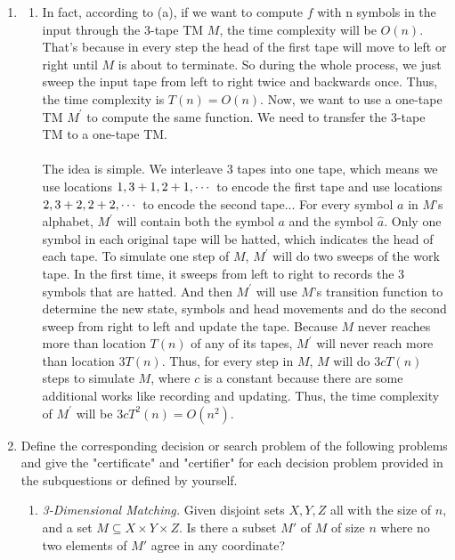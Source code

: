 \documentclass[12pt,a4paper]{article}
\makeatletter
\newtheorem*{solution}{Solution}
\theoremstyle{definition}
\renewenvironment{solution}[1][Solution] {\par\pushQED{\qed}\normalfont\topsep6\p@\@plus6\p@\relax\trivlist\item[\hskip\labelsep\bfseries#1\@addpunct{.}]\ignorespaces}{\popQED\endtrivlist\@endpefalse} \makeatother
\makeatother
\begin{document}
\begin{enumerate}
\begin{solution}
\begin{enumerate}
	    \item
	    In fact, according to (a), if we want to compute $f$ with n symbols in the input through the 3-tape TM $M$, the time complexity will be $O(n)$. That's because in every step the head of the first tape will move to left or right until $M$ is about to terminate. So during the whole process, we just sweep the input tape from left to right twice and backwards once. Thus, the time complexity is $T(n)=O(n)$. Now, we want to use a one-tape TM $M^{'}$ to compute the same function. We need to transfer the 3-tape TM to a one-tape TM.\\
	    ~\\
	    The idea is simple. We interleave 3 tapes into one tape, which means we use locations $1,3+1,2\time 3+1,\cdots$ to encode the first tape and use locations $2,3+2,2\time 3+2,\cdots$ to encode the second tape... For every symbol $a$ in $M$'s alphabet, $M^{'}$ will contain both the symbol $a$ and the symbol $\hat{a}$. Only one symbol in each original tape will be hatted, which indicates the head of each tape. To simulate one step of $M$, $M^{'}$ will do two sweeps of the work tape. In the first time, it sweeps from left to right to records the 3 symbols that are hatted. And then $M^{'}$ will use $M$'s transition function to determine the new state, symbols and head movements and do the second sweep from right to left and update the tape. Because $M$ never reaches more than location $T(n)$ of any of its tapes, $M^{'}$ will never reach more than location $3T(n)$. Thus, for every step in $M$, $M$ will do $3c T(n)$ steps to simulate $M$, where $c$ is a constant because there are some additional works like recording and updating. Thus, the time complexity of $M^{'}$ will be $3c T^2(n)=O(n^2)$.
	\end{enumerate}
	\end{solution}
	
	\newpage
	\item Define the corresponding decision or search problem of the following problems and give the "certificate" and "certifier" for each decision problem provided in the subquestions or defined by yourself.
	
	\begin{enumerate}
	    \item
	    \textit{3-Dimensional Matching.}  Given disjoint sets $X,Y,Z$ all with the size of $n$, and a set $M \subseteq X\times Y\times Z$.  Is there a subset $M'$ of $M$ of size $n$ where no two elements of $M'$ agree in any coordinate?
	    

\end{enumerate}
\end{enumerate}
\end{document}
